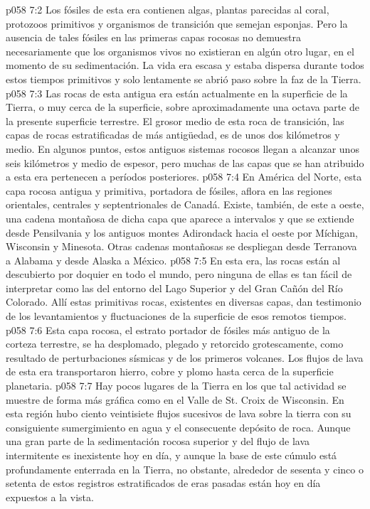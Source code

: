 \vs p058 7:2 Los fósiles de esta era contienen algas, plantas parecidas al coral, protozoos primitivos y organismos de transición que semejan esponjas. Pero la ausencia de tales fósiles en las primeras capas rocosas no demuestra necesariamente que los organismos vivos no existieran en algún otro lugar, en el momento de su sedimentación. La vida era escasa y estaba dispersa durante todos estos tiempos primitivos y solo lentamente se abrió paso sobre la faz de la Tierra.
\vs p058 7:3 \pc Las rocas de esta antigua era están actualmente en la superficie de la Tierra, o muy cerca de la superficie, sobre aproximadamente una octava parte de la presente superficie terrestre. El grosor medio de esta roca de transición, las capas de rocas estratificadas de más antigüedad, es de unos dos kilómetros y medio. En algunos puntos, estos antiguos sistemas rocosos llegan a alcanzar unos seis kilómetros y medio de espesor, pero muchas de las capas que se han atribuido a esta era pertenecen a períodos posteriores.
\vs p058 7:4 En América del Norte, esta capa rocosa antigua y primitiva, portadora de fósiles, aflora en las regiones orientales, centrales y septentrionales de Canadá. Existe, también, de este a oeste, una cadena montañosa de dicha capa que aparece a intervalos y que se extiende desde Pensilvania y los antiguos montes Adirondack hacia el oeste por Míchigan, Wisconsin y Minesota. Otras cadenas montañosas se despliegan desde Terranova a Alabama y desde Alaska a México.
\vs p058 7:5 En esta era, las rocas están al descubierto por doquier en todo el mundo, pero ninguna de ellas es tan fácil de interpretar como las del entorno del Lago Superior y del Gran Cañón del Río Colorado. Allí estas primitivas rocas, existentes en diversas capas, dan testimonio de los levantamientos y fluctuaciones de la superficie de esos remotos tiempos.
\vs p058 7:6 Esta capa rocosa, el estrato portador de fósiles más antiguo de la corteza terrestre, se ha desplomado, plegado y retorcido grotescamente, como resultado de perturbaciones sísmicas y de los primeros volcanes. Los flujos de lava de esta era transportaron hierro, cobre y plomo hasta cerca de la superficie planetaria.
\vs p058 7:7 Hay pocos lugares de la Tierra en los que tal actividad se muestre de forma más gráfica como en el Valle de St. Croix de Wisconsin. En esta región hubo ciento veintisiete flujos sucesivos de lava sobre la tierra con su consiguiente sumergimiento en agua y el consecuente depósito de roca. Aunque una gran parte de la sedimentación rocosa superior y del flujo de lava intermitente es inexistente hoy en día, y aunque la base de este cúmulo está profundamente enterrada en la Tierra, no obstante, alrededor de sesenta y cinco o setenta de estos registros estratificados de eras pasadas están hoy en día expuestos a la vista.
